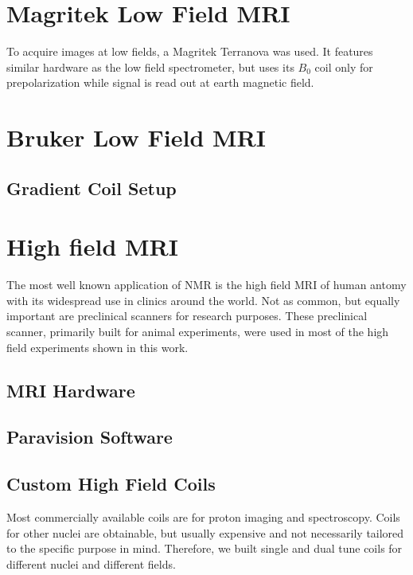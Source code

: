 	\section{Magritek Low Field MRI}
		To acquire images at low fields, a Magritek Terranova  was used. It features
		similar hardware as the low field spectrometer, but uses its $B_0$ coil only for
		prepolarization while signal is read out at earth magnetic field.
	\section{Bruker Low Field MRI}
		\subsection{Gradient Coil Setup}
	\section{High field MRI}
		The most well known application of NMR is the high field MRI of human antomy with its
		widespread use in clinics around the world. Not as common, but equally important are
		preclinical scanners for research purposes. These preclinical scanner, primarily built for
		animal experiments, were used in most of the high field experiments shown in this work.
		\subsection{MRI Hardware}
			
		\subsection{Paravision Software}
		\subsection{Custom High Field Coils}
			Most commercially available coils are for proton imaging and spectroscopy. Coils for
			other nuclei are obtainable, but usually expensive and not necessarily tailored to the
			specific purpose in mind. Therefore, we built single and dual tune coils for different
			nuclei and different fields.
